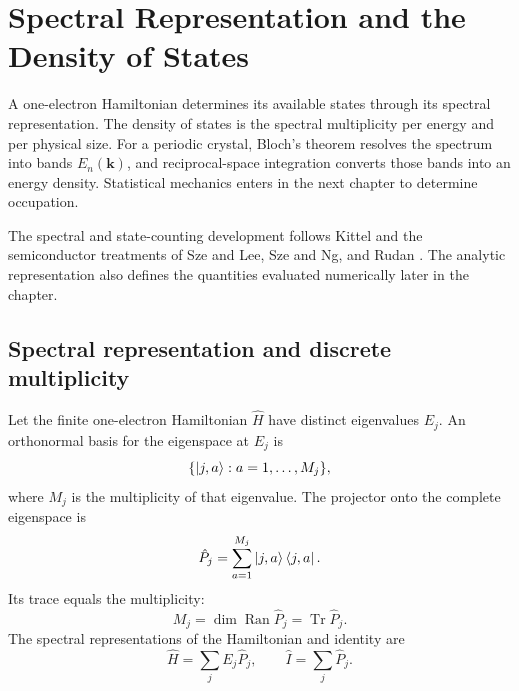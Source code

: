 \chapter{Spectral Representation and the Density of States}
\label{ch:band-to-density-of-states}

A one-electron Hamiltonian determines its available states through its spectral
representation.  The density of states is the spectral multiplicity per energy
and per physical size.  For a periodic crystal, Bloch's theorem resolves the
spectrum into bands $E_n(\bm k)$, and reciprocal-space integration converts
those bands into an energy density.  Statistical mechanics enters in the next
chapter to determine occupation.

The spectral and state-counting development follows Kittel and the semiconductor
treatments of Sze and Lee, Sze and Ng, and Rudan
\cite{kittel2005,szeLee2012,szeNg2007,rudan2015}.  The analytic representation
also defines the quantities evaluated numerically later in the chapter.

\section{Spectral representation and discrete multiplicity}

Let the finite one-electron Hamiltonian $\hat H$ have distinct eigenvalues
$E_j$.  An orthonormal basis for the eigenspace at $E_j$ is
\begin{equation}
  \{\ket{j,a}:a=1,\ldots,M_j\},
  \label{eq:energy-eigenspace-basis}
\end{equation}
where $M_j$ is the multiplicity of that eigenvalue.  The projector onto the
complete eigenspace is
\begin{equation}
  \hat P_j
  =\sum_{a=1}^{M_j}\ket{j,a}\bra{j,a}.
  \label{eq:energy-eigenspace-projector}
\end{equation}
Its trace equals the multiplicity:
\begin{equation}
  M_j=\dim\operatorname{Ran}\hat P_j
  =\operatorname{Tr}\hat P_j.
  \label{eq:discrete-energy-multiplicity}
\end{equation}
The spectral representations of the Hamiltonian and identity are
\begin{equation}
  \boxed{
  \hat H=\sum_jE_j\hat P_j,
  \qquad
  \hat I=\sum_j\hat P_j.
  }
  \label{eq:hamiltonian-spectral-representation}
\end{equation}

